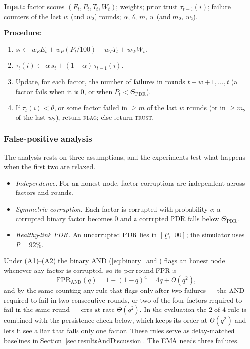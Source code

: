 \documentclass{ieeeaccess}
\begin{document}
\begin{algorithm}[!t]
\caption{Extension~I trust update for node $i$ at round $t$.}
\label{alg:ema}
\noindent\textbf{Input:} factor scores $(E_t,P_t,T_t,W_t)$; weights;
prior trust $\tau_{t-1}(i)$; failure counters of the last $w$ (and
$w_2$) rounds; $\alpha$, $\theta$, $m$, $w$ (and $m_2$, $w_2$).

\noindent\textbf{Procedure:}
\begin{enumerate}\setlength{\itemsep}{0pt}\setlength{\parskip}{0pt}
  \item $s_t \gets w_E E_t + w_P (P_t/100) + w_T T_t + w_W W_t$.
  \item $\tau_t(i) \gets \alpha\,s_t + (1-\alpha)\,\tau_{t-1}(i)$.
  \item Update, for each factor, the number of failures in rounds
        $t-w+1,\dots,t$ (a factor fails when it is $0$, or when
        $P_t<\Theta_{\mathrm{PDR}}$).
  \item If $\tau_t(i)<\theta$, or some factor failed in $\ge m$ of the
        last $w$ rounds (or in $\ge m_2$ of the last $w_2$), return
        \textsc{flag}; else return \textsc{trust}.
\end{enumerate}
\end{algorithm}

\subsubsection{False-positive analysis}
The analysis rests on three assumptions, and the experiments test what
happens when the first two are relaxed.
\begin{itemize}
\item[(A1)] \emph{Independence.}  For an honest node, factor
corruptions are independent across factors and rounds.
\item[(A2)] \emph{Symmetric corruption.}  Each factor is corrupted
with probability $q$; a corrupted binary factor becomes $0$ and a
corrupted PDR falls below $\Theta_{\mathrm{PDR}}$.
\item[(A3)] \emph{Healthy-link PDR.}  An uncorrupted PDR lies in
$[\underline{P},100]$; the simulator uses $\underline{P}=92\%$.
\end{itemize}
Under (A1)--(A2) the binary AND (\ref{eq:binary_and}) flags an honest
node whenever any factor is corrupted, so its per-round FPR is
\begin{equation}
\mathrm{FPR}_{\mathrm{AND}}(q) = 1-(1-q)^{4} = 4q + O(q^{2}),
\label{eq:fpr_and}
\end{equation}
and by the same counting any rule that flags only after two failures
--- the AND required to fail in two consecutive rounds, or two of the
four factors required to fail in the same round --- errs at rate
$\Theta(q^{2})$.  In the evaluation the 2-of-4 rule is combined with
the persistence check below, which keeps its order at $\Theta(q^{2})$
and lets it see a liar that fails only one factor.  These rules serve as delay-matched baselines in
Section~\ref{sec:resultsAndDiscussion}.  The EMA needs three failures.
\end{document}
